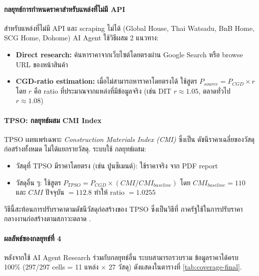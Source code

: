 \paragraph{กลยุทธ์การกำหนดราคาสำหรับแหล่งที่ไม่มี API}

สำหรับแหล่งที่ไม่มี API และ scraping ไม่ได้ (Global House, Thai Watsadu,
BnB Home, SCG Home, Dohome) AI Agent ใช้วิธีผสม 2 แนวทาง:

\begin{itemize}[leftmargin=2em,itemsep=0.2em]
  \item \textbf{Direct research:} ค้นหาราคาจากเว็บไซต์โดยตรงผ่าน
        Google Search หรือ browse URL ของหน้าสินค้า
  \item \textbf{CGD-ratio estimation:} เมื่อไม่สามารถหาราคาโดยตรงได้
        ใช้สูตร $P_{source} = P_{CGD} \times r$ โดย $r$ คือ ratio
        ที่ประมาณจากแหล่งที่มีข้อมูลจริง (เช่น DIT $r \approx 1.05$,
        ตลาดทั่วไป $r \approx 1.08$)
\end{itemize}

\paragraph{TPSO: กลยุทธ์ผสม CMI Index}

TPSO เผยแพร่เฉพาะ \emph{Construction Materials Index (CMI)} ซึ่งเป็น
ดัชนีราคาเฉลี่ยของวัสดุก่อสร้างทั้งหมด ไม่ได้แยกรายวัสดุ. ระบบใช้
กลยุทธ์ผสม:
\begin{itemize}[leftmargin=2em,itemsep=0.2em]
  \item วัสดุที่ TPSO มีราคาโดยตรง (เช่น ปูนซีเมนต์): ใช้ราคาจริง
        จาก PDF report
  \item วัสดุอื่น ๆ: ใช้สูตร $P_{TPSO} = P_{CGD} \times (CMI / CMI_{baseline})$
        โดย $CMI_{baseline} = 110$ และ $CMI$ ปัจจุบัน $= 112.8$
        ทำให้ ratio $= 1.0255$
\end{itemize}

วิธีนี้สะท้อนการปรับราคาตามดัชนีวัสดุก่อสร้างของ TPSO ซึ่งเป็นวิธีที่
ภาครัฐใช้ในการปรับราคากลางงานก่อสร้างตามสภาวะตลาด \cite{tpso2569}.

\paragraph{ผลลัพธ์ของกลยุทธ์ที่ 4}

หลังจากใช้ AI Agent Research ร่วมกับกลยุทธ์อื่น ระบบสามารถรวบรวม
ข้อมูลราคาได้ครบ 100\% (297/297 cells = 11 แหล่ง $\times$ 27 วัสดุ)
ดังแสดงในตารางที่ \ref{tab:coverage-final}.

